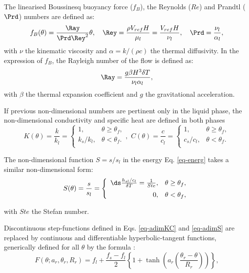 \noindent The linearised Boussinesq buoyancy force ($f_B$), the Reynolds ($Re$) and Prandtl ($\Prd$) numbers are defined as:
\begin{equation}\label{eq-RePr}
f_B(\theta) = \frac{\Ray}{\Prd \Rey^2} \theta, \quad \Rey = \frac{\rho V_{ref} H}{\mu_l}=  \frac{V_{ref} H}{\nu_l} , \quad \Prd = \frac{\nu_l}{\alpha_l},
\end{equation}
with $\nu$ the kinematic viscosity and $\alpha = k/(\rho c)$  the thermal diffusivity. In the expression of $f_B$, the Rayleigh number of the flow is defined as:
\begin{equation}
\label{eq-Rayleigh}
\Ray = \frac{g \beta H^3 \delta T}{\nu_l \alpha_l},
\end{equation}
with $\beta$ the thermal expansion coefficient and $g$ the gravitational acceleration.

\noindent If previous non-dimensional numbers are pertinent only in the liquid phase, the non-dimensional conductivity and specific heat are  defined in both phases
\begin{equation}\label{eq-adimKC}
K(\theta)= \frac{k}{k_l} =\left\{
\begin{matrix}
1, & \theta \geq \theta_f ,\\
k_s/k_l, & \theta < \theta_f .\\
\end{matrix}
\right.
, \,  \, C(\theta) = \frac{c}{c_l}=\left\{
\begin{matrix}
1, & \theta \geq \theta_f ,\\
c_s/c_l, & \theta < \theta_f .\\
\end{matrix}
\right.
\end{equation}

\noindent The non-dimensional function $S = s/s_l$ in the energy Eq. \ref{eq-energ} takes a similar non-dimensional form:
\begin{equation}\label{eq-adimS}
S(\theta)= \frac{s}{s_l} =\left\{
\begin{array}{rl} \vspace{0.2cm}
\ds \frac{h_{sl}/c_l}{\delta T} = \frac{1}{Ste}, & \theta \geq \theta_f ,\\
0, & \theta < \theta_f,\\
\end{array}
\right.
\end{equation}

\noindent with $Ste$ the Stefan number.

\noindent Discontinuous step-functions defined in Eqs. \ref{eq-adimKC}  and \ref{eq-adimS} are replaced by continuous and differentiable hyperbolic-tangent functions, generically defined for all $\theta$ by the formula \citep{dan-2014-JCP}:
\begin{equation}
F(\theta; a_r, \theta_r, R_r) = f_l + \frac{f_s-f_l}{2}\left\{
1 + \tanh\left( a_r \left(\frac{\theta_r-\theta}{R_r}\right)\right)
\right\},
\label{eq-smooth}
\end{equation}

